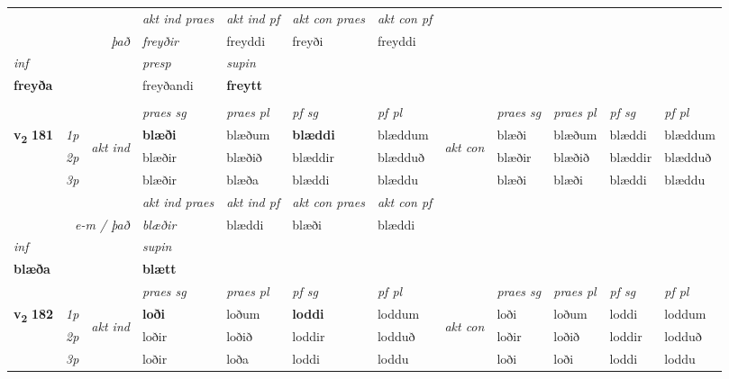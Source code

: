\begin{longtable}[l]{X>{\footnotesize\itshape}llXXXXlXXXX}
   && &  \textit{akt ind praes} & \textit{akt ind pf} & \textit{akt con praes} & \textit{akt con pf} \\*
\multicolumn{3}{r}{\textit{það}} & freyðir & freyddi & freyði & freyddi \\*

\cmidrule{4-7}
   {\textit{inf}} & &     & \textit{presp} & \textit{supin}   \\*
  {\textbf{freyða}} & &     & freyðandi &  \textbf{freytt}   \\*
\midrule
& \\
\midrule
 & &   & \textit{praes sg}  & \textit{praes pl}    & \textit{ pf sg} & \textit{pf pl} & & \textit{praes sg}  & \textit{praes pl}    & \textit{pf sg} & \textit{pf pl }  \\ \cmidrule{4-7} \cmidrule{9-12}
 \multirow{2}{*}{{{\textbf{v{\textsubscript{2}}} \Large{\textbf{181}}}}}  & 1p & \multirow{3}{*}{\begin{turn}{90}\textit{akt ind}\end{turn}} & \textbf{blæði} & blæðum & \textbf{blæddi} & blæddum & \multirow{3}{*}{\begin{turn}{90}\textit{akt con}\end{turn}} &blæði & blæðum & blæddi & blæddum\\*
 & 2p &  &  blæðir  & blæðið & blæddir & blædduð & & blæðir & blæðið & blæddir & blædduð \\*
 & 3p &  & blæðir & blæða & blæddi & blæddu & & blæði & blæði& blæddi & blæddu \\*
\cmidrule{4-7} \cmidrule{9-12}

   && &  \textit{akt ind praes} & \textit{akt ind pf} & \textit{akt con praes} & \textit{akt con pf} \\*
\multicolumn{3}{r}{\textit{e-m / það}} & blæðir & blæddi & blæði & blæddi \\*

\cmidrule{4-7}
   {\textit{inf}} & &      & \textit{supin}   \\*
  {\textbf{blæða}} & &      &  \textbf{blætt}   \\*

\midrule

 & &   & \textit{praes sg}  & \textit{praes pl}    & \textit{ pf sg} & \textit{pf pl} & & \textit{praes sg}  & \textit{praes pl}    & \textit{pf sg} & \textit{pf pl }  \\ \cmidrule{4-7} \cmidrule{9-12}
 \multirow{2}{*}{{{\textbf{v{\textsubscript{2}}} \Large{\textbf{182}}}}}  & 1p & \multirow{3}{*}{\begin{turn}{90}\textit{akt ind}\end{turn}} & \textbf{loði} & loðum & \textbf{loddi} & loddum & \multirow{3}{*}{\begin{turn}{90}\textit{akt con}\end{turn}} &loði & loðum & loddi & loddum\\*
 & 2p &  &  loðir  & loðið & loddir & lodduð & & loðir & loðið & loddir & lodduð \\*
 & 3p &  & loðir & loða & loddi & loddu & & loði & loði& loddi & loddu \\*
\cmidrule{4-7} \cmidrule{9-12}


\end{longtable}
